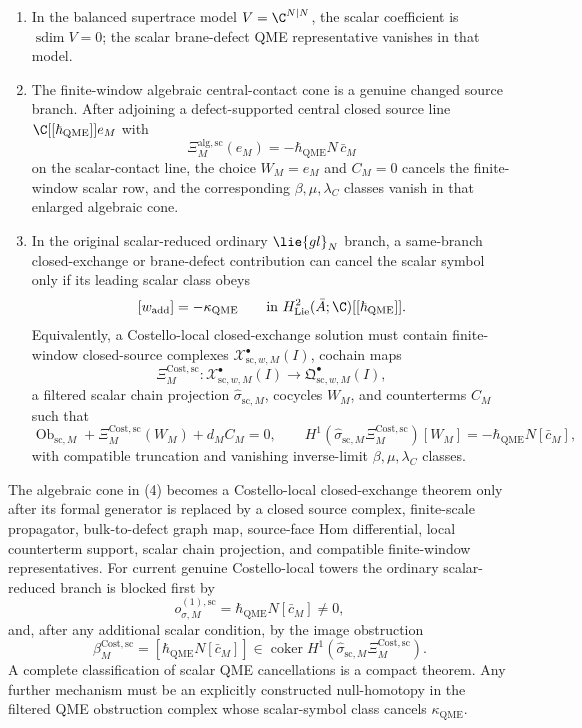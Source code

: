 \documentclass[11pt]{memoir}
\begin{document}
\begin{thm}
\begin{enumerate}
    \item In the balanced supertrace model \(V=\C^{N|N}\), the scalar
      coefficient is \(\operatorname{sdim}V=0\); the scalar
      brane-defect QME representative vanishes in that model.
    \item The finite-window algebraic central-contact cone is a genuine
      changed source branch.  After adjoining a defect-supported central
      closed source line \(\C[[\hbar_{\mathrm{QME}}]]e_M\) with
      \[
        \Xi^{\mathrm{alg},\mathrm{sc}}_M(e_M)
        =
        -\hbar_{\mathrm{QME}}N\,\bar c_M
      \]
      on the scalar-contact line, the choice \(W_M=e_M\) and \(C_M=0\)
      cancels the finite-window scalar row, and the corresponding
      \(\beta,\mu,\lambda_C\) classes vanish in that enlarged algebraic
      cone.
    \item In the original scalar-reduced ordinary \(\lie{gl}_N\) branch, a
      same-branch closed-exchange or brane-defect contribution can cancel
      the scalar symbol only if its leading scalar class obeys
      \[
        [w_{\mathrm{add}}]=-\kappa_{\mathrm{QME}}
        \qquad\text{in }
        H^2_{\mathrm{Lie}}(\bar A;\C)[[\hbar_{\mathrm{QME}}]].
      \]
      Equivalently, a Costello-local closed-exchange solution must contain
      finite-window closed-source complexes
      \(\mathcal X^\bullet_{\mathrm{sc},w,M}(I)\), cochain maps
      \[
        \Xi^{\mathrm{Cost},\mathrm{sc}}_M\colon
        \mathcal X^\bullet_{\mathrm{sc},w,M}(I)\to
        \mathfrak Q^\bullet_{\mathrm{sc},w,M}(I),
      \]
      a filtered scalar chain projection
      \(\widehat\sigma_{\mathrm{sc},M}\), cocycles \(W_M\), and
      counterterms \(C_M\) such that
      \[
        \operatorname{Ob}_{\mathrm{sc},M}
        +\Xi^{\mathrm{Cost},\mathrm{sc}}_M(W_M)+d_MC_M=0,
        \qquad
        H^1(\widehat\sigma_{\mathrm{sc},M}
        \Xi^{\mathrm{Cost},\mathrm{sc}}_M)[W_M]
        =
        -\hbar_{\mathrm{QME}}N[\bar c_M],
      \]
      with compatible truncation and vanishing inverse-limit
      \(\beta,\mu,\lambda_C\) classes.
  \end{enumerate}
  The algebraic cone in (4) becomes a Costello-local closed-exchange
  theorem only after its formal generator is replaced by a closed source
  complex, finite-scale propagator, bulk-to-defect graph map, source-face
  Hom differential, local counterterm support, scalar chain projection,
  and compatible finite-window representatives.  For current genuine
  Costello-local towers the ordinary scalar-reduced branch is blocked first
  by
  \[
    o_{\sigma,M}^{(1),\mathrm{sc}}
      =\hbar_{\mathrm{QME}}N[\bar c_M]\ne0,
  \]
  and, after any additional scalar condition, by the image obstruction
  \[
    \beta_M^{\mathrm{Cost},\mathrm{sc}}
    =
    [\hbar_{\mathrm{QME}}N[\bar c_M]]
    \in
    \operatorname{coker}
    H^1(\widehat\sigma_{\mathrm{sc},M}
    \Xi^{\mathrm{Cost},\mathrm{sc}}_M).
  \]
  A complete classification of scalar QME cancellations is a compact
  theorem.  Any further mechanism must be an explicitly
  constructed null-homotopy in
  the filtered QME obstruction complex whose scalar-symbol class cancels
  \(\kappa_{\mathrm{QME}}\).
\end{thm}
\end{document}
